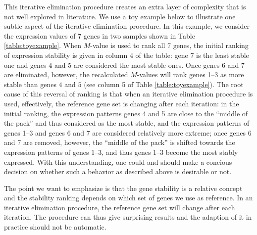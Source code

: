 \documentclass[letterpaper,12pt]{article}
\begin{document}
This iterative elimination procedure creates an extra layer of complexity that
is not well explored in literature. We use a toy example below to illustrate
one subtle aspect of the iterative elimination procedure.  In this example, we
consider the expression values of 7 genes in two samples shown in Table
\ref{table:toyexample}. When $M$-value is used to rank all $7$ genes, the
initial ranking of expression stability is given in column 4 of the table:
gene $7$ is the least stable one and genes $4$ and $5$ are considered the most
stable ones.  Once genes 6 and 7 are eliminated, however, the recalculated
$M$-values will rank genes 1--3 as more stable than genes $4$ and
$5$ (see column 5 of Table \ref{table:toyexample}). The root cause of this
reversal of ranking is that when an iterative elimination procedure is used,
effectively, the reference gene set is changing after each iteration: in the
initial ranking, the expression patterns genes 4 and 5 are close to the
``middle of the pack'' and thus considered as the most stable, and the
expression patterns of genes 1--3 and genes 6 and 7 are considered relatively
more extreme; once genes 6 and 7 are removed, however, the ``middle of the
pack'' is shifted towards the expression patterns of genes 1--3, and thus
genes 1--3 become the most stably expressed.  With this understanding, one
could and should make a concious decision on whether such a behavior as
described above is desirable or not.  

The point we want to emphasize is that the gene stability is a relative concept
and the stability ranking depends on which set of genes we use as reference.
In an iterative elimination procedure, the reference gene set will change
after each iteration. The procedure can thus give surprising results and the
adaption of it in practice should not be automatic.
\end{document}
